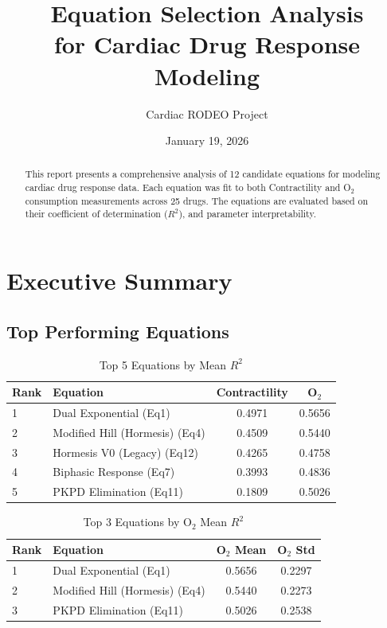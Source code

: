 \documentclass[11pt,a4paper]{article}
\title{Equation Selection Analysis\\for Cardiac Drug Response Modeling}
\author{Cardiac RODEO Project}
\date{January 19, 2026}
\begin{document}
\maketitle

\begin{abstract}
This report presents a comprehensive analysis of 12 candidate equations
for modeling cardiac drug response data. Each equation was fit to both Contractility and O$_2$ consumption
measurements across 25 drugs. The equations are evaluated based
on their coefficient of determination ($R^2$), and parameter interpretability.
\end{abstract}

\tableofcontents
\newpage

\section{Executive Summary}

\subsection{Top Performing Equations}

\begin{table}[H]
\centering
\caption{Top 5 Equations by Mean $R^2$}
\begin{tabular}{llcc}
\toprule
\textbf{Rank} & \textbf{Equation} & \textbf{Contractility} & \textbf{O$_2$} \\
\midrule
1 & Dual Exponential (Eq1) & 0.4971 & 0.5656 \\
2 & Modified Hill (Hormesis) (Eq4) & 0.4509 & 0.5440 \\
3 & Hormesis V0 (Legacy) (Eq12) & 0.4265 & 0.4758 \\
4 & Biphasic Response (Eq7) & 0.3993 & 0.4836 \\
5 & PKPD Elimination (Eq11) & 0.1809 & 0.5026 \\
\bottomrule
\end{tabular}
\end{table}

\begin{table}[H]
\centering
\caption{Top 3 Equations by O$_2$ Mean $R^2$}
\begin{tabular}{llcc}
\toprule
\textbf{Rank} & \textbf{Equation} & \textbf{O$_2$ Mean} & \textbf{O$_2$ Std} \\
\midrule
1 & Dual Exponential (Eq1) & 0.5656 & 0.2297 \\
2 & Modified Hill (Hormesis) (Eq4) & 0.5440 & 0.2273 \\
3 & PKPD Elimination (Eq11) & 0.5026 & 0.2538 \\
\bottomrule
\end{tabular}
\end{table}
\end{document}

